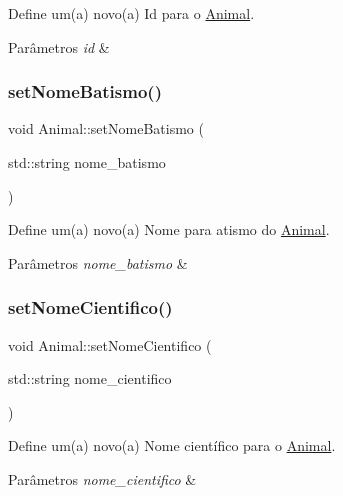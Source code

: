 Define um(a) novo(a) Id para o \hyperlink{classAnimal}{Animal}. 


\begin{DoxyParams}{Parâmetros}
{\em id} & \\
\hline
\end{DoxyParams}
\mbox{\label{classAnimal_a6f77d89ef0c02d85dfe1dd7508122ce3}} 
\subsubsection{\texorpdfstring{set\+Nome\+Batismo()}{setNomeBatismo()}}
{\footnotesize\ttfamily void Animal\+::set\+Nome\+Batismo (\begin{DoxyParamCaption}\item[{std\+::string}]{nome\+\_\+batismo }\end{DoxyParamCaption})}



Define um(a) novo(a) Nome para atismo do \hyperlink{classAnimal}{Animal}. 


\begin{DoxyParams}{Parâmetros}
{\em nome\+\_\+batismo} & \\
\hline
\end{DoxyParams}
\mbox{\label{classAnimal_ad2e0ffb0dcb6b58467010d9f11488899}} 
\subsubsection{\texorpdfstring{set\+Nome\+Cientifico()}{setNomeCientifico()}}
{\footnotesize\ttfamily void Animal\+::set\+Nome\+Cientifico (\begin{DoxyParamCaption}\item[{std\+::string}]{nome\+\_\+cientifico }\end{DoxyParamCaption})}



Define um(a) novo(a) Nome científico para o \hyperlink{classAnimal}{Animal}. 


\begin{DoxyParams}{Parâmetros}
{\em nome\+\_\+cientifico} & \\
\hline
\end{DoxyParams}
\mbox{\label{classAnimal_aab32d5ad6689a4e19cfd43a303c939af}} 
